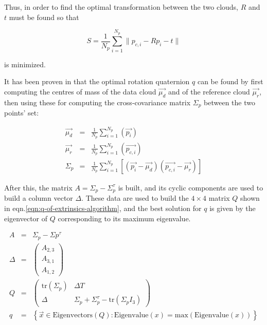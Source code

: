Thus, in order to find the optimal transformation between the two clouds, $R$
and $t$ must be found so that

\begin{equation}
  S=\frac{1}{N_p}\sum_{i=1}^{N_p}\lVert p_{c,i} - Rp_i -t  \rVert
\end{equation}

is minimized.

It has been proven in \cite{extrinsics-algorithm}that the optimal rotation
quaternion $q$ can be found by first computing the centres of mass of the data
cloud $\vec{\mu_d}$ and of the reference cloud $\vec{\mu_r}$, then using these for
computing the cross-covariance matrix $\Sigma_{p}$ between the two points' set:

\begin{eqnarray}
  \vec{\mu_d} & = &  \frac{1}{N_p}\sum_{i=1}^{N_p}\left(\vec{p_i}\right) \\
  \vec{\mu_r} & = &  \frac{1}{N_p}\sum_{i=1}^{N_p}\left(\vec{p_{c,i}}\right) \\
  \Sigma_{p} & = &
  \frac{1}{N_p}\sum_{i=1}^{N_p}\left[\left(\vec{p_i}-\vec{\mu_d}\right)\left(\vec{p_{c,i}}-\vec{\mu_r}\right)\right]
\end{eqnarray}

After this, the matrix $A=\Sigma_{p}-\Sigma_{p}^{\tau}$ is built, and its cyclic
components are used to build a column vector $\Delta$. These data are used to
build the $4 \times 4$ matrix $Q$ shown in
eqn.\ref{eqn:q-of-extrinsics-algorithm}, and the best solution for $q$ is given
by the eigenvector of $Q$ corresponding to its maximum eigenvalue.

\begin{eqnarray}
  A & = & \Sigma_{p}-\Sigma{p}^{\tau} \\
\Delta & = & \begin{pmatrix}A_{2,3}\\A_{3,1}\\A_{1,2}\end{pmatrix} \\
  Q & = & \begin{pmatrix}
  \text{tr}(\Sigma_{p}) & \Delta T \\
  \Delta & \Sigma_{p}+\Sigma_{p}^{\tau}-\text{tr}(\Sigma_{p}I_{3}) 
\end{pmatrix} \label{eqn:q-of-extrinsics-algorithm}\\
q & = & \left\{ \vec{x} \in \text{Eigenvectors}(Q) :
  \text{Eigenvalue}(x)=\text{max}\left(\text{Eigenvalue}(x)\right) \right\}
\end{eqnarray}



